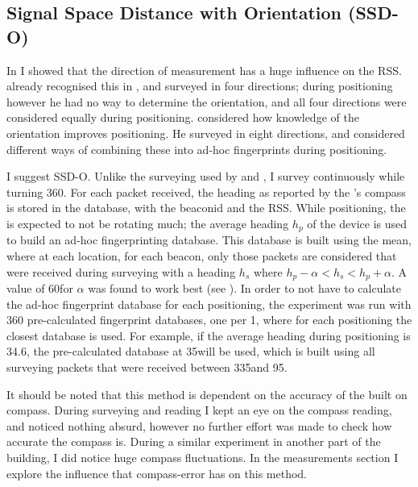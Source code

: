 \subsection{Signal Space Distance with Orientation (SSD-O)}
\label{sec:architecture-ssd-o}
In  I showed that the direction of measurement has a huge influence on the RSS.
\citet{bahl2000radar} already recognised this in \wifi, and surveyed in four directions; during positioning however he had no way to determine the orientation, and all four directions were considered equally during positioning.
\citet{king2006compass} considered how knowledge of the orientation improves positioning.
He surveyed in eight directions, and considered different ways of combining these into ad-hoc fingerprints during positioning.

I suggest SSD-O.
Unlike the \wifi surveying used by \citet{bahl2000radar} and \citet{king2006compass}, I survey continuously while turning 360\textdegree.
For each packet received, the heading as reported by the \device's compass is stored in the database, with the beaconid and the RSS.
While positioning, the \device is expected to not be rotating much; the average heading $h_p$ of the device is used to build an ad-hoc fingerprinting database.
This database is built using the mean, where at each location, for each beacon, only those packets are considered that were received during surveying with a heading $h_s$ where $h_p - \alpha < h_s < h_p + \alpha$.
A value of 60\textdegree for $\alpha$ was found to work best (see ).
In order to not have to calculate the ad-hoc fingerprint database for each positioning, the experiment was run with 360 pre-calculated fingerprint databases, one per 1\textdegree, where for each positioning the closest database is used.
For example, if the average heading during positioning is 34.6\textdegree, the pre-calculated database at 35\textdegree will be used, which is built using all surveying packets that were received between 335\textdegree and 95\textdegree.

It should be noted that this method is dependent on the accuracy of the built on compass.
During surveying and reading I kept an eye on the compass reading, and noticed nothing absurd, however no further effort was made to check how accurate the compass is.
During a similar experiment in another part of the building, I did notice huge compass fluctuations.
In the measurements section I explore the influence that compass-error has on this method.


